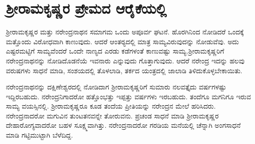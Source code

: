 
\chapter{ಶ‍್ರೀರಾಮಕೃಷ್ಣರ ಪ್ರೇಮದ ಆರೈಕೆಯಲ್ಲಿ}

ಶ‍್ರೀರಾಮಕೃಷ್ಣರ ಮತ್ತು ನರೇಂದ್ರನಾಥನ ಸಮಾಗಮ ಒಂದು ಅಪೂರ್ವ ಘಟನೆ. ಹೊರಗಿನಿಂದ ನೋಡಿದರೆ ಒಂದಕ್ಕೆ ಮತ್ತೊಂದು ವಿರೋಧವಾಗಿ ಕಾಣುವುದು. ಆದರೆ ಆಂತರ‍್ಯದಲ್ಲಿ ಮಾತ್ರ ಸಾಮ್ಯವಿರುವುದನ್ನು ನೋಡುವೆವು. ಅದು ಎಷ್ಟರಮಟ್ಟಿಗೆ ಸಾಮ್ಯವೆಂದರೆ ಒಂದೇ ನಾಣ್ಯದ ಎರಡು ಕಡೆಗಳಂತೆ ಕಾಣುವಷ್ಟು ಸಾಮ್ಯ.\break ಶ‍್ರೀರಾಮಕೃಷ್ಣರಿಗೆ ನರೇಂದ್ರನಾಥನನ್ನು ನೋಡಿದೊಡನೆಯೆ ಇವನಾರು ಎನ್ನುವುದು ಗೊತ್ತಾಗುವುದು. ಆದರೆ ನರೇಂದ್ರ ಇದನ್ನು ಹಲವು ವರುಷಗಳು ಸಾಧನೆ ಮಾಡಿ, ಸಂಶಯದಲ್ಲಿ ತೊಳಲಾಡಿ, ತರ್ಕದ ಯಂತ್ರದಲ್ಲಿ ಜಾಲಾಡಿ ತಿಳಿದುಕೊಳ್ಳಬೇಕಾಯಿತು.

ನರೇಂದ್ರನಾಥನನ್ನು ದಕ್ಷಿಣೇಶ್ವರದಲ್ಲಿ ನೋಡಿದಾಗ ಶ‍್ರೀರಾಮಕೃಷ್ಣರಿಗೆ ಸುಮಾರು ನಲವತ್ತೈದು ವರ್ಷಗಳಷ್ಟು ಇದ್ದಿರಬಹುದು. ನರೇಂದ್ರನಿಗಾದರೋ ಹತ್ತೊಂಭತ್ತು ಇಪ್ಪತ್ತು ವರ್ಷಗಳು ಇರಬಹುದು. ತಂದೆಗೂ ಮಗನಿಗೂ ಇರುವ ಸಾಮ್ಯ ವಯಸ್ಸಿನಲ್ಲಿ. ಶ‍್ರೀರಾಮಕೃಷ್ಣರೂ ಕೂಡ ತಂದೆಯ ಪ್ರೀತಿಯನ್ನು ನರೇಂದ್ರನ ಮೇಲೆ ಹರಿಸಿದರು. ನರೇಂದ್ರನಾದರೋ ಮಗುವಿನ ತುಂಟತನವನ್ನೇ ತೋರುವನು. ಪ್ರಚಂಡ ಸಾಧನೆ ಮಾಡಿ ಶ‍್ರೀರಾಮಕೃಷ್ಣರ ದೇಹಾರೋಗ್ಯವಾದರೋ ಬಹಳ ಸೂಕ್ಷ್ಮವಾಗಿತ್ತು. ನರೇಂದ್ರನಾದರೋ ಗರಡಿಯ ಮನೆಯಲ್ಲಿ ಚೆನ್ನಾಗಿ ಅಂಗಸಾಧನೆ ಮಾಡಿ ಗಟ್ಟಿಮುಟ್ಟಾಗಿ ಬೆಳೆದಿದ್ದ.

